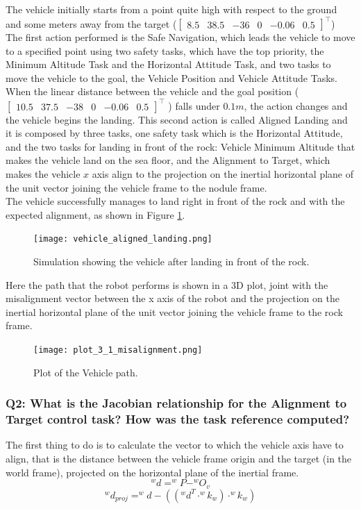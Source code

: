 \documentclass{article}
\begin{document}
The vehicle initially starts from a point quite high with respect to the ground and some meters away from the target ({\small\(\begin{bmatrix} 8.5 & 38.5 & -36 & 0 & -0.06 & 0.5 \end{bmatrix}^\top\)})\\
The first action performed is the Safe Navigation, which leads the vehicle to move to a specified point using two safety tasks, which have the top priority, the Minimum Altitude Task and the Horizontal Attitude Task, and two tasks to move the vehicle to the goal, the Vehicle Position and Vehicle Attitude Tasks.\\
When the linear distance between the vehicle and the goal position ({\small \(\begin{bmatrix} 10.5 & 37.5 & -38 & 0 & -0.06 & 0.5 \end{bmatrix}^\top\) }) falls under $0.1 m$, the action changes and the vehicle begins the landing. This second action is called Aligned Landing and it is composed by three tasks, one safety task which is the Horizontal Attitude, and the two tasks for landing in front of the rock: Vehicle Minimum Altitude that makes the vehicle land on the sea floor, and the Alignment to Target, which makes the vehicle $x$ axis align to the projection on the inertial horizontal plane of the unit vector joining the vehicle frame to the nodule frame.\\ 
The vehicle successfully manages to land right in front of the rock and with the expected alignment, as shown in Figure \ref{im:v_align_land}.

\begin{figure}[H]
	\centering
	{\texttt{[image: vehicle\_aligned\_landing.png]}}
	\caption{Simulation showing the vehicle after landing in front of the rock.}
	\label{im:v_align_land}
\end{figure}

Here the path that the robot performs is shown in a 3D plot, joint with the misalignment vector between the x axis of the robot and the projection on the inertial horizontal plane of the unit vector joining the vehicle frame to the rock frame.

\begin{figure}[H]
	\centering
	{\texttt{[image: plot\_3\_1\_misalignment.png]}}
	\caption{Plot of the Vehicle path.}
	\label{im:v_path_align_land}
\end{figure}

\subsubsection{Q2: What is the Jacobian relationship for the Alignment to Target control task? How was the task reference computed?}
The first thing to do is to calculate the vector to which the vehicle axis have to align, that is the distance between the vehicle frame origin  and the target (in the world frame), projected on the horizontal plane of the inertial frame. 
$$ ^wd = ^wP - ^wO_v$$
$$^wd_{proj} = ^wd - ((^wd^T \cdot ^wk_w) \cdot ^wk_w)$$
\end{document}
